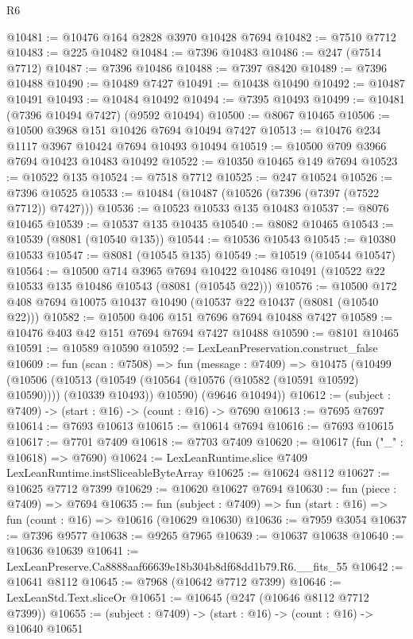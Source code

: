 \begin{lexlean}{R6}
\begin{coremodule}
@10481 := @10476 @164 @2828 @3970 @10428 @7694
@10482 := @7510 @7712
@10483 := @225 @10482
@10484 := @7396 @10483
@10486 := @247 (@7514 @7712)
@10487 := @7396 @10486
@10488 := @7397 @8420
@10489 := @7396 @10488
@10490 := @10489 @7427
@10491 := @10438 @10490
@10492 := @10487 @10491
@10493 := @10484 @10492
@10494 := @7395 @10493
@10499 := @10481 (@7396 @10494 @7427) (@9592 @10494)
@10500 := @8067 @10465
@10506 := @10500 @3968 @151 @10426 @7694 @10494 @7427
@10513 := @10476 @234 @1117 @3967 @10424 @7694 @10493 @10494
@10519 := @10500 @709 @3966 @7694 @10423 @10483 @10492
@10522 := @10350 @10465 @149 @7694
@10523 := @10522 @135
@10524 := @7518 @7712
@10525 := @247 @10524
@10526 := @7396 @10525
@10533 := @10484 (@10487 (@10526 (@7396 (@7397 (@7522 @7712)) @7427)))
@10536 := @10523 @10533 @135 @10483
@10537 := @8076 @10465
@10539 := @10537 @135 @10435
@10540 := @8082 @10465
@10543 := @10539 (@8081 (@10540 @135))
@10544 := @10536 @10543
@10545 := @10380 @10533
@10547 := @8081 (@10545 @135)
@10549 := @10519 (@10544 @10547)
@10564 := @10500
    @714
    @3965
    @7694
    @10422
    @10486
    @10491
    (@10522 @22 @10533 @135 @10486 @10543 (@8081 (@10545 @22)))
@10576 := @10500 @172 @408 @7694 @10075 @10437 @10490 (@10537 @22 @10437 (@8081 (@10540 @22)))
@10582 := @10500 @406 @151 @7696 @7694 @10488 @7427
@10589 := @10476 @403 @42 @151 @7694 @7694 @7427 @10488
@10590 := @8101 @10465
@10591 := @10589 @10590
@10592 := LexLeanPreservation.construct_false
@10609 := fun (scan : @7508) =>
  fun (message : @7409) =>
  @10475
    (@10499
      (@10506
        (@10513 (@10549 (@10564 (@10576 (@10582 (@10591 @10592) @10590)))) (@10339 @10493))
        @10590)
      (@9646 @10494))
@10612 := (subject : @7409) -> (start : @16) -> (count : @16) -> @7690
@10613 := @7695 @7697
@10614 := @7693 @10613
@10615 := @10614 @7694
@10616 := @7693 @10615
@10617 := @7701 @7409
@10618 := @7703 @7409
@10620 := @10617 (fun ("_" : @10618) => @7690)
@10624 := LexLeanRuntime.slice @7409 LexLeanRuntime.instSliceableByteArray
@10625 := @10624 @8112
@10627 := @10625 @7712 @7399
@10629 := @10620 @10627 @7694
@10630 := fun (piece : @7409) => @7694
@10635 := fun (subject : @7409) => fun (start : @16) => fun (count : @16) => @10616 (@10629 @10630)
@10636 := @7959 @3054
@10637 := @7396 @9577
@10638 := @9265 @7965
@10639 := @10637 @10638
@10640 := @10636 @10639
@10641 := LexLeanPreserve.Ca8888aaf66639e18b304b8df68dd1b79.R6.__fits_55
@10642 := @10641 @8112
@10645 := @7968 (@10642 @7712 @7399)
@10646 := LexLeanStd.Text.sliceOr
@10651 := @10645 (@247 (@10646 @8112 @7712 @7399))
@10655 := (subject : @7409) -> (start : @16) -> (count : @16) -> @10640 @10651

\end{coremodule}
\end{lexlean}
